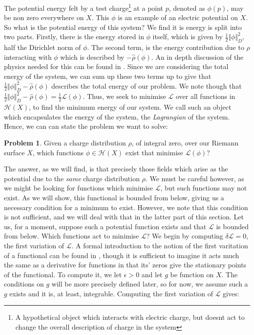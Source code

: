 \documentclass[11pt]{report}
\theoremstyle{definition}
\newtheorem*{problem}{Problem}
\begin{document}
The potential energy felt by a test charge\footnote{A hypothetical object which interacts with electric charge, but doesnt act to change the overall description of charge in the system} at a point $p$, denoted as $\phi(p)$, may be non zero everywhere on $X$. This $\phi$ is an example of an electric potential on $X$. So what is the potential energy of this system? We find it is energy is split into two parts. Firstly, there is the energy stored in $\phi$ itself, which is given by $\frac{1}{2}\Vert \phi \Vert^2_D$, half the Dirichlet norm of $\phi$. The second term, is the energy contribution due to $\rho$ interacting with $\phi$ which is described by $-\hat{\rho}(\phi)$. An in depth discussion of the physics needed for this can be found in \cite[Chapter 1]{electromagentismBook}. Since we are considering the total energy of the system, we can sum up these two terms up to give that $\frac{1}{2}\Vert \phi \Vert^2_D - \hat{\rho}(\phi)$ describes the total energy of our problem. We note though that $\frac{1}{2}\Vert \phi \Vert^2_D - \hat{\rho}(\phi) = \frac{1}{2}\mathcal{L}(\phi)$. Thus, we seek to minimise $\mathcal{L}$ over all functions in $\mathcal{H}(X)$, to find the minimum energy of our system. We call such an object which encapsulates the energy of the system, the \emph{Lagrangian} of the system. Hence, we can can state the problem we want to solve:
\begin{problem}
  Given a charge distribution $\rho$, of integral zero, over our Riemann surface $X$, which functions $\phi \in \mathcal{H}(X)$ exist that minimise $\mathcal{L}(\phi)$?
\end{problem}
The answer, as we will find, is that precisely those fields which arise as the potential due to the \emph{same} charge distribution $\rho$. We must be careful however, as we might be looking for functions which minimise $\mathcal{L}$, but such functions may not exist. As we will show, this functional is bounded from below, giving us a necessary condition for a minimum to exist. However, we note that this condition is not sufficient, and we will deal with that in the latter part of this section. Let us, for a moment, suppose such a potential function exists and that $\mathcal{L}$ is bounded from below. Which functions act to minimise $\mathcal{L}$? We begin by computing $\delta \mathcal{L}= 0 $, the first variation of $\mathcal{L}$. A formal introduction to the notion of the first varitation of a functional can be found in \cite[p.4]{jost}, though it is sufficient to imagine it acts much the same as a derivative for functions in that its' zeros give the stationary points of the functional. To compute it, we let $\epsilon > 0$ and let $g$ be function on $X$. The conditions on $g$ will be more precisely defined later, so for now, we assume such a $g$ exists and it is, at least, integrable. Computing the first variation of $\mathcal{L}$ gives:
\end{document}
